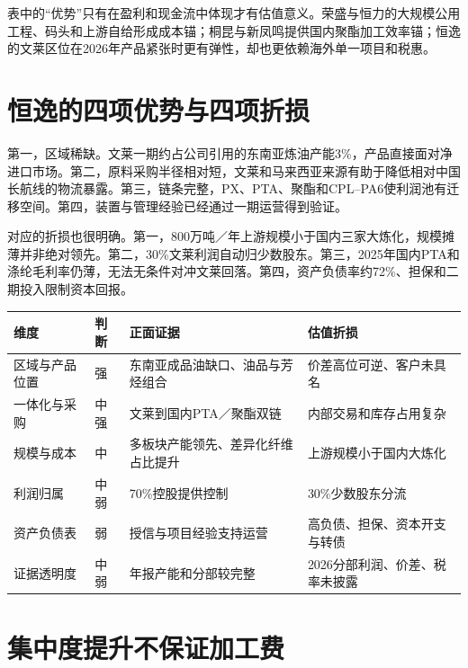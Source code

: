 表中的“优势”只有在盈利和现金流中体现才有估值意义。荣盛与恒力的大规模公用工程、码头和上游自给形成成本锚；桐昆与新凤鸣提供国内聚酯加工效率锚；恒逸的文莱区位在2026年产品紧张时更有弹性，却也更依赖海外单一项目和税惠。

\section{恒逸的四项优势与四项折损}

第一，区域稀缺。文莱一期约占公司引用的东南亚炼油产能3\%，产品直接面对净进口市场。第二，原料采购半径相对短，文莱和马来西亚来源有助于降低相对中国长航线的物流暴露。第三，链条完整，PX、PTA、聚酯和CPL--PA6使利润池有迁移空间。第四，装置与管理经验已经通过一期运营得到验证。

对应的折损也很明确。第一，800万吨／年上游规模小于国内三家大炼化，规模摊薄并非绝对领先。第二，30\%文莱利润自动归少数股东。第三，2025年国内PTA和涤纶毛利率仍薄，无法无条件对冲文莱回落。第四，资产负债率约72\%、担保和二期投入限制资本回报。

\begin{exhibitbox}
\noindent\begin{tabularx}{\textwidth}{L{2.6cm}C{1.5cm}L{3.45cm}X}
\toprule
\textbf{维度} & \textbf{判断} & \textbf{正面证据} & \textbf{估值折损} \\
\midrule
区域与产品位置 & 强 & 东南亚成品油缺口、油品与芳烃组合 & 价差高位可逆、客户未具名 \\
一体化与采购 & 中强 & 文莱到国内PTA／聚酯双链 & 内部交易和库存占用复杂 \\
规模与成本 & 中 & 多板块产能领先、差异化纤维占比提升 & 上游规模小于国内大炼化 \\
利润归属 & 中弱 & 70\%控股提供控制 & 30\%少数股东分流 \\
资产负债表 & 弱 & 授信与项目经验支持运营 & 高负债、担保、资本开支与转债 \\
证据透明度 & 中弱 & 年报产能和分部较完整 & 2026分部利润、价差、税率未披露 \\
\bottomrule
\end{tabularx}
\end{exhibitbox}

\section{集中度提升不保证加工费}

